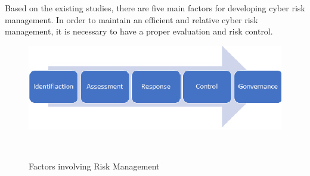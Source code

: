 \documentclass[conference]{IEEEtran}
\begin{document}
Based on the existing studies, there are five main factors for developing cyber risk management. In order to maintain an efficient and relative cyber risk management, it is necessary to have a proper evaluation and risk control.  
\begin{figure}
\centering
  \includegraphics[width=0.9\columnwidth]{fig1.png}
  \caption{Factors involving Risk Management}~\label{fig:figure1}
\end{figure}
\end{document}
